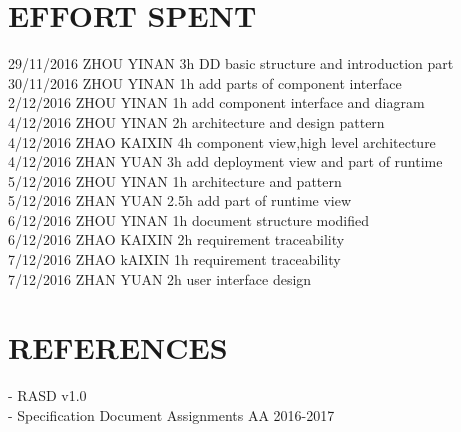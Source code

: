 \documentclass{article}
\begin{document}
	\section{EFFORT SPENT}
	29/11/2016 ZHOU YINAN 3h DD basic structure and introduction part\\
	30/11/2016 ZHOU YINAN 1h add parts of component interface\\
	2/12/2016 ZHOU YINAN 1h add component interface and diagram\\
	4/12/2016 ZHOU YINAN 2h architecture and design pattern\\
	4/12/2016 ZHAO KAIXIN 4h component view,high level architecture\\
	4/12/2016 ZHAN YUAN 3h add deployment view and part of runtime\\
	5/12/2016 ZHOU YINAN 1h architecture and pattern\\
	5/12/2016 ZHAN YUAN 2.5h add part of runtime view \\
	6/12/2016 ZHOU YINAN 1h document structure modified	\\
	6/12/2016 ZHAO KAIXIN 2h requirement traceability\\
	7/12/2016 ZHAO kAIXIN 1h requirement traceability\\
	7/12/2016 ZHAN YUAN   2h user interface design
	
	
	\newpage
	\section{REFERENCES}
	- RASD v1.0 \\
	-  Specification Document Assignments AA 2016-2017
	
\end{document}
